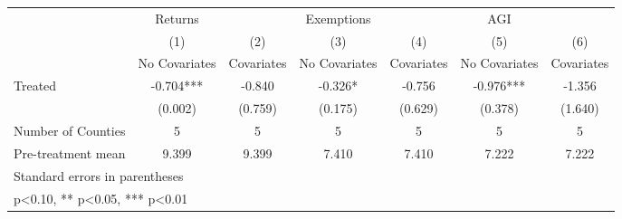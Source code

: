 {
\def\sym#1{\ifmmode^{#1}\else\(^{#1}\)\fi}
\begin{tabular}{l*{6}{c}}
\hline\hline
            &     Returns   &               &  Exemptions   &               &         AGI   &               \\
            &\multicolumn{1}{c}{(1)}&\multicolumn{1}{c}{(2)}&\multicolumn{1}{c}{(3)}&\multicolumn{1}{c}{(4)}&\multicolumn{1}{c}{(5)}&\multicolumn{1}{c}{(6)}\\
            &\multicolumn{1}{c}{No Covariates}&\multicolumn{1}{c}{Covariates}&\multicolumn{1}{c}{No Covariates}&\multicolumn{1}{c}{Covariates}&\multicolumn{1}{c}{No Covariates}&\multicolumn{1}{c}{Covariates}\\
\hline
Treated     &      -0.704***&      -0.840   &      -0.326*  &      -0.756   &      -0.976***&      -1.356   \\
            &     (0.002)   &     (0.759)   &     (0.175)   &     (0.629)   &     (0.378)   &     (1.640)   \\
\hline
Number of Counties&           5   &           5   &           5   &           5   &           5   &           5   \\
Pre-treatment mean&       9.399   &       9.399   &       7.410   &       7.410   &       7.222   &       7.222   \\
\hline\hline
\multicolumn{7}{l}{\footnotesize Standard errors in parentheses}\\
\multicolumn{7}{l}{\footnotesize * p<0.10, ** p<0.05, *** p<0.01}\\
\end{tabular}
}
